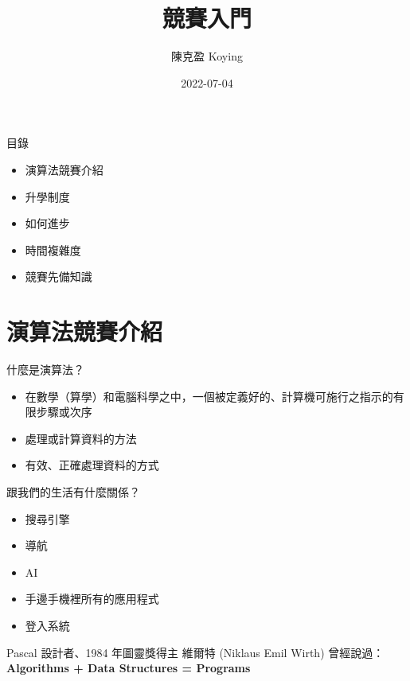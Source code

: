 \documentclass[aspectratio=169]{beamer}
\title{競賽入門}
\author{陳克盈 Koying}
\date{2022-07-04}
\begin{document}
    \begin{frame}
        \titlepage
    \end{frame}
    
    \begin{frame}{目錄}
    	\begin{itemize}
    		\item 演算法競賽介紹
    		\item 升學制度
    		\item 如何進步
    		\item 時間複雜度
    		\item 競賽先備知識
    	\end{itemize}
    \end{frame}
    
	\section{演算法競賽介紹} 
    
    \begin{frame}{什麼是演算法？}
    	\begin{itemize}
    		\item 在數學（算學）和電腦科學之中，一個被定義好的、計算機可施行之指示的有限步驟或次序
    		\item 處理或計算資料的方法
    		\item 有效、正確處理資料的方式
    	\end{itemize}
    \end{frame}
    
    \begin{frame}{跟我們的生活有什麼關係？}
    	\begin{itemize}
    		\item 搜尋引擎
	    	\item 導航
	    	\item AI
    		\item 手邊手機裡所有的應用程式
    		\item 登入系統
    	\end{itemize}
    	
    \end{frame}
    
    \begin{frame}
    	\begin{center}
    		Pascal 設計者、1984 年圖靈獎得主 維爾特 (Niklaus Emil Wirth) 曾經說過：\\
	    	\textbf{Algorithms + Data Structures = Programs}
    	\end{center}
    	
    \end{frame}
    
\end{document}
